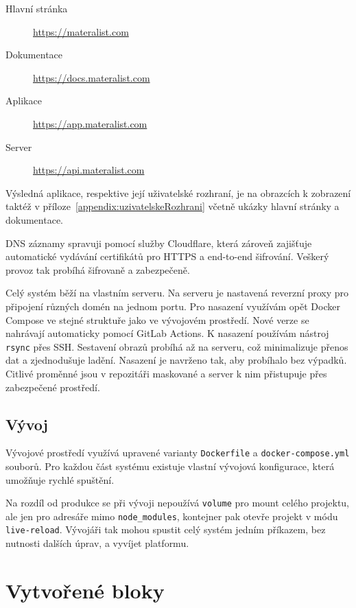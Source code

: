 \begin{description}
    \item[Hlavní stránka] \href{https://materalist.com}{https://materalist.com}
    \item[Dokumentace] \href{https://docs.materalist.com}{https://docs.materalist.com}
    \item[Aplikace] \href{https://app.materalist.com}{https://app.materalist.com}
    \item[Server] \href{https://api.materalist.com}{https://api.materalist.com}
\end{description}

Výsledná aplikace, respektive její uživatelské rozhraní, je na obrazcích k zobrazení taktéž v příloze~\ref{appendix:uzivatelskeRozhrani} včetně ukázky hlavní stránky a dokumentace.

DNS záznamy spravuji pomocí služby Cloudflare, která zároveň zajišťuje automatické vydávání certifikátů pro HTTPS a end-to-end šifrování. 
Veškerý provoz tak probíhá šifrovaně a zabezpečeně.

Celý systém běží na vlastním serveru. 
Na serveru je nastavená reverzní proxy pro připojení různých domén na jednom portu.
Pro nasazení využívám opět Docker Compose ve stejné struktuře jako ve vývojovém prostředí.
Nové verze se nahrávají automaticky pomocí GitLab Actions. 
K nasazení používám nástroj \texttt{rsync} přes SSH. 
Sestavení obrazů probíhá až na serveru, což minimalizuje přenos dat a zjednodušuje ladění. 
Nasazení je navrženo tak, aby probíhalo bez výpadků. 
Citlivé proměnné jsou v repozitáři maskované a server k nim přistupuje přes zabezpečené prostředí.

\subsection{Vývoj}

Vývojové prostředí využívá upravené varianty \texttt{Dockerfile} a \texttt{docker-compose.yml} souborů. Pro každou část systému existuje vlastní vývojová konfigurace, která umožňuje rychlé spuštění.

Na rozdíl od produkce se při vývoji nepoužívá \texttt{volume} pro mount celého projektu, ale jen pro adresáře mimo \texttt{node\_modules}, kontejner pak otevře projekt v módu \texttt{live-reload}.
Vývojáři tak mohou spustit celý systém jedním příkazem, bez nutnosti dalších úprav, a vyvíjet platformu.

\section{Vytvořené bloky}\label{text:realizace/vytvoreneBloky}

